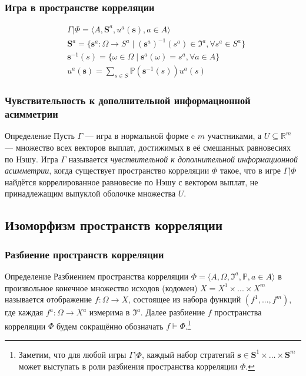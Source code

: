\begin{frame}
	\frametitle{Игра в пространстве корреляции}
	\begin{align*}
		&\Gamma | \Phi = \langle A, \mathbf{S}^a, u^a(\mathbf{s}), a \in A \rangle \\
		&\mathbf{S}^a = \{\mathbf{s}^a : \Omega \rightarrow S^a \mid (\mathbf{s}^a)^{-1}(s^a) \in \mathfrak{I}^a, \forall s^a \in S^a\} \\
		&\mathbf{s}^{-1}(s) = \{\omega \in \Omega \mid \mathbf{s}^a(\omega) = s^a, \forall a \in A\} \\
		&u^a(\mathbf{s}) = \sum\limits_{s \in S} \mathbb{P}(\mathbf{s}^{-1}(s)) u^a(s)
	\end{align*}
\end{frame}

\begin{frame}
	\frametitle{Чувствительность к дополнительной информационной асимметрии}
	\begin{block}{Определение}
		Пусть $\Gamma$ --- игра в нормальной форме c $m$ участниками, а $U \subseteq \mathbb{R}^m$ --- множество всех векторов выплат, достижимых в её смешанных равновесиях по Нэшу. Игра $\Gamma$ называется \emph{чувствительной к дополнительной информационной асимметрии}, когда существует пространство корреляции $\Phi$ такое, что в игре $\Gamma | \Phi$ найдётся коррелированное равновесие по Нэшу с вектором выплат, не принадлежащим выпуклой оболочке множества $U$.
	\end{block}
\end{frame}

\subsection{Изоморфизм пространств корреляции}

\begin{frame}
    \frametitle{Разбиение пространств корреляции}
    \begin{block}{Определение}
        Разбиением пространства корреляции $\Phi = \langle A, \Omega, \mathfrak{I}^a, \mathbb{P}, a \in A \rangle$ в произвольное конечное множество исходов (кодомен) $X = X^1 \times ... \times X^m$ называется отображение $f : \Omega \rightarrow X$, состоящее из набора функций $(f^1, ..., f^m)$, где каждая $f^a : \Omega \rightarrow X^a$ измерима в $\mathfrak{I}^a$. Далее разбиение $f$ пространства корреляции $\Phi$ будем сокращённо обозначать $f \models \Phi$.\footnote{Заметим, что для любой игры $\Gamma | \Phi$, каждый набор стратегий $\mathbf{s} \in \mathbf{S}^1 \times \ldots \times \mathbf{S}^m$ может выступать в роли разбиения пространства корреляции $\Phi$.}
    \end{block}
\end{frame}

